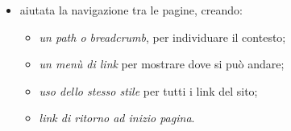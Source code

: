 {{\begin{itemize}
			\item aiutata la navigazione tra le pagine, creando:
			\begin{itemize}\itemsep1pt
				\item \textit{un path o breadcrumb}, per individuare il contesto;
				\item \textit{un menù di link} per mostrare dove si può andare;
				\item \textit{uso dello stesso stile} per tutti i link del sito;
				\item \textit{link di ritorno ad inizio pagina}.
			\end{itemize}
		\end{itemize}
	}
}
